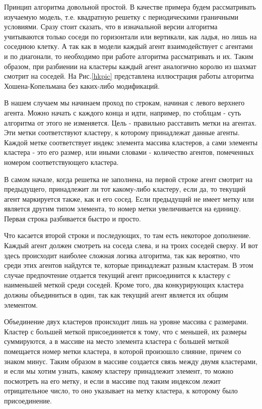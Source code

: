 \documentclass[a4paper]{article}
\begin{document}
	\par Принцип алгоритма довольной простой. В качестве примера будем рассматривать изучаемую модель, т.е. квадратную решетку с периодическими граничными условиями. Сразу стоит сказать, что в изначальной версии алгоритма учитываются только соседи по горизонтали или вертикали, как ладья, но лишь на соседнюю клетку. А так как в модели каждый агент взаимодействует с агентами и по диагонали, то необходимо при работе алгоритма рассматривать и их. Таким образом, при разбиении на кластеры каждый агент аналогично королю из шахмат смотрит на соседей. На Рис.\ref{hkpic} представлена иллюстрация работы алгоритма Хошена-Копельмана без каких-либо модификаций.   
	\par В нашем случаем мы начинаем проход по строкам, начиная с левого верхнего агента. Можно начать с каждого конца и идти, например, по стоблцам - суть алгоритма от этого не изменяется. Цель - правильно расставить метки на агентах. Эти метки соответствуют кластеру, к которому принадлежат данные агенты. Каждой метке соответствует индекс элемента массива кластеров, а сами элементы кластера - это его размер, или иными словами - количество агентов, помеченных номером соответствующего кластера.
	\par В самом начале, когда решетка не заполнена, на первой строке агент смотрит на предыдущего, принадлежит ли тот какому-либо кластеру, если да, то текущий агент маркируется также, как и его сосед. Если предыдущий не имеет метку или является другим типом элемента, то номер метки увеличивается на единицу. Первая строка разбивается быстро и просто. 
	\par Что касается второй строки и последующих, то там есть некоторое дополнение. Каждый агент должен смотреть на соседа слева, и на троих соседей сверху. И вот здесь происходит наиболее сложная логика алгоритма, так как вероятно, что среди этих агентов найдутся те, которые принадлежат разным кластерам. В этом случае предпочтение отдается текущий агент присоединится к кластеру с наименьшей меткой среди соседей. Кроме того, два конкурирующих кластера должны объединиться в один, так как текущий агент является их общим элементом. 
	\par Объединение двух кластеров происходит лишь на уровне массива с размерами. Кластер с большей меткой присоединяется к тому, что с меньшей, их размеры суммируются, а в массиве на место элемента кластера с большей меткой помещается номер метки кластера, в которой произошло слияние, причем со знаком минус. Таким образом в массиве создается связь между двумя кластерами, и если мы хотим узнать, какому кластеру принадлежит элемент, то можно посмотреть на его метку, и если в массиве под таким индексом лежит отрицательное число, то оно указывает на метку кластера, к которому было присоединение.
	
\end{document}
